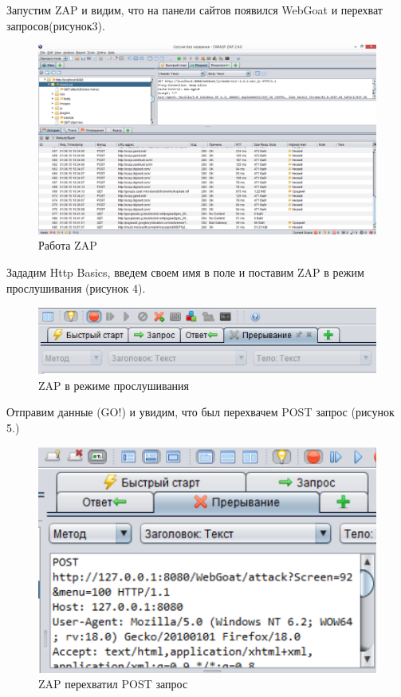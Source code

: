 \documentclass[10pt,a4paper]{article}
\begin{document}
\FloatBarrier
Запустим ZAP и видим, что на панели сайтов появился WebGoat и перехват запросов(рисунок3).
\FloatBarrier
\begin{figure}[h!]
\centering
\includegraphics[scale=0.4]{3}
\caption{Работа ZAP}
\end{figure}
\FloatBarrier
Зададим Http Basics, введем своем имя в поле и поставим ZAP в режим прослушивания (рисунок 4).
\FloatBarrier
\begin{figure}[h!]
\centering
\includegraphics[scale=0.4]{4}
\caption{ZAP в режиме прослушивания}
\end{figure}
\FloatBarrier
Отправим данные (GO!) и увидим, что был перехвачем POST запрос (рисунок 5.)
\FloatBarrier
\begin{figure}[h!]
\centering
\includegraphics[scale=0.4]{5}
\caption{ZAP перехватил POST запрос}
\end{figure}
\FloatBarrier
\end{document}
